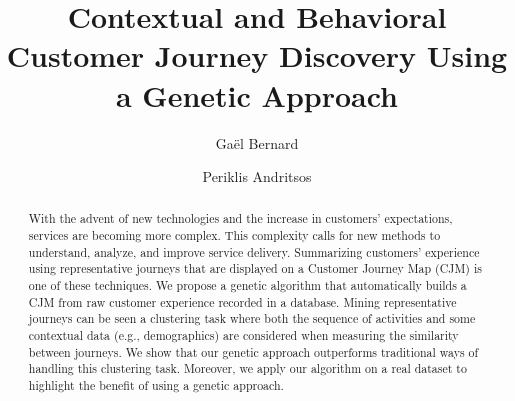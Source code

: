 \documentclass[runningheads]{llncs}
\begin{document}
%
\title{Contextual and Behavioral Customer Journey Discovery Using a Genetic Approach}
%
%
\author{Ga{\"e}l Bernard \and
Periklis Andritsos}
%
%
%
\maketitle              
%
\begin{abstract}
With the advent of new technologies and the increase in customers' expectations, services are becoming more complex. This complexity calls for new methods to understand, analyze, and improve service delivery. Summarizing customers' experience using representative journeys that are displayed on a Customer Journey Map (CJM) is one of these techniques. We propose a genetic algorithm that automatically builds a CJM from raw customer experience recorded in a database. Mining representative journeys can be seen a clustering task where both the sequence of activities and some contextual data (e.g., demographics) are considered when measuring the similarity between journeys. We show that our genetic approach outperforms traditional ways of handling this clustering task. Moreover, we apply our algorithm on a real dataset to highlight the benefit of using a genetic approach. 

\end{abstract}
\end{document}
